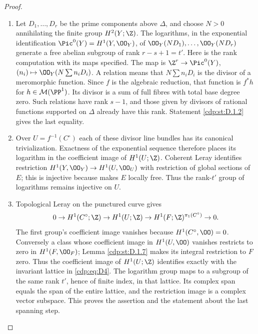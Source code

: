 \begin{proof}

\begin{enumerate}[label={$\langle1\rangle$\arabic*.},leftmargin=*]
\item Let $D_1,\ldots,D_r$ be the prime components above $\Delta$, and
choose $N>0$ annihilating the finite group $H^2(Y;\Z)$.
The logarithms, in the exponential identification
$\Pic^0(Y)=H^1(Y,\OO_Y)$, of
$\OO_Y(ND_1),\ldots,\OO_Y(ND_r)$ generate a free abelian
subgroup of rank $r-s+1=t'$.
Here is the rank computation with its maps specified. The map is
$\Z^r\to\Pic^0(Y)$, $(n_i)\mapsto\OO_Y(N\sum n_iD_i)$.
A relation means that $N\sum n_iD_i$ is the divisor of a
meromorphic function. Since $f$ is the algebraic reduction, that
function is $f^*h$ for $h\in\mathcal M(\PP^1)$.
Its divisor is a sum of full fibres with total base degree zero.
Such relations have rank $s-1$, and those given by divisors of
rational functions supported on $\Delta$ already have this rank.
Statement \ref{cdp:st:D.1.2} gives the last equality.

\item Over $U=f^{-1}(C^\circ)$ each of these divisor line bundles has
its canonical trivialization. Exactness of the exponential sequence
therefore places its logarithm in the coefficient image of
$H^1(U;\Z)$. Coherent Leray identifies restriction
$H^1(Y,\OO_Y)\to H^1(U,\OO_U)$ with restriction of global
sections of $E$; this is injective because  makes $E$ locally free.
Thus the rank-$t'$ group of logarithms remains injective on $U$.

\item Topological Leray on the punctured curve gives
\[
0\to H^1(C^\circ;\Z)\to H^1(U;\Z)
\to H^1(F;\Z)^{\pi_1(C^\circ)}\to0.
\]
The first group's coefficient image vanishes because
$H^1(C^\circ,\OO)=0$. Conversely a class whose coefficient image
in $H^1(U,\OO)$ vanishes restricts to zero in $H^1(F,\OO_F)$;
Lemma \ref{cdp:st:D.1.7} makes its integral restriction to $F$ zero. Thus the
coefficient image of $H^1(U;\Z)$ identifies exactly with the
invariant lattice in \eqref{cdp:eq:D4}. The logarithm group maps to a subgroup
of the same rank $t'$, hence of finite index, in that lattice.
Its complex span equals the span of the entire lattice, and the
restriction image is a complex vector subspace. This proves the
assertion and the statement about the last spanning step.

\end{enumerate}
\end{proof}
